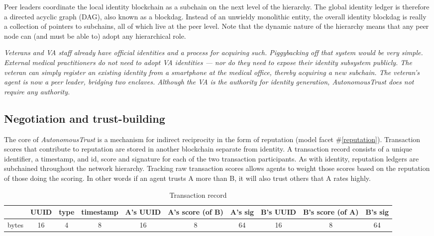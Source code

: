 \documentclass[10pt, twoside]{article}
\newenvironment{ppl}{\fontfamily{ppl}\selectfont\itshape}{\par}
\newcommand{\projectName}{\emph{AutonomousTrust }}
\begin{document}
Peer leaders coordinate the local identity blockchain as a subchain on the next level of the hierarchy. The global identity ledger is therefore a directed acyclic graph (DAG), also known as a blockdag. Instead of an unwieldy monolithic entity, the overall identity blockdag is really a collection of pointers to subchains, all of which live at the peer level. Note that the dynamic nature of the hierarchy means that any peer node can (and must be able to) adopt any hierarchical role.

\begin{ppl}
Veterans and VA staff already have official identities and a process for acquiring such. Piggybacking off that system would be very simple. External medical practitioners do not need to adopt VA identities --- nor do they need to expose their identity subsystem publicly. The veteran can simply register an existing identity from a smartphone at the medical office, thereby acquiring a new subchain. The veteran's agent is now a peer leader, bridging two enclaves. Although the VA is the authority for identity generation, \projectName does not \emph{require} any authority.
\end{ppl}


\subsection{Negotiation and trust-building} \label{negotiation}

The core of \projectName is a mechanism for indirect reciprocity in the form of reputation (model facet \#\ref{reputation}). Transaction scores that contribute to reputation are stored in another blockchain separate from identity. A transaction record consists of a unique identifier, a timestamp, and id, score and signature for each of the two transaction participants. As with identity, reputation ledgers are subchained throughout the network hierarchy. Tracking raw transaction scores allows agents to weight those scores based on the reputation of those doing the scoring. In other words if an agent trusts A more than B, it will also trust others that A rates highly.

\begin{table}[h!]
	\centering
	\begin{tabular}{ |l||c|c|c|c|c|c|c|c|c| }
		\hline
		& UUID & type & timestamp & A's UUID  & A's score (of B) & A's sig & B's UUID &  B's score (of A) & B's sig \\
		\hline
		bytes & 16 & 4 & 8 & 16 & 8 & 64 & 16 & 8 & 64 \\
		\hline
	\end{tabular}
	\caption{Transaction record}
	\label{table:reputation}
\end{table}
\end{document}
